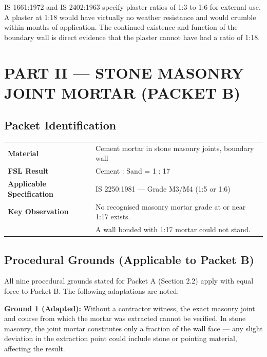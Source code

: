 \documentclass[12pt, a4paper]{article}
\begin{document}
IS 1661:1972 and IS 2402:1963 specify plaster ratios of 1:3 to 1:6 for external use. A plaster at 1:18 would have virtually no weather resistance and would crumble within months of application. The continued existence and function of the boundary wall is direct evidence that the plaster cannot have had a ratio of 1:18.

\section{PART II --- STONE MASONRY JOINT MORTAR (PACKET B)}

\subsection{Packet Identification}

\begin{center}
\begin{tabular}{|l|l|}
  \hline
  \textbf{Material} & Cement mortar in stone masonry joints, boundary wall \\
  \textbf{FSL Result} & Cement : Sand = 1 : 17 \\
  \textbf{Applicable Specification} & IS 2250:1981 --- Grade M3/M4 (1:5 or 1:6) \\
  \textbf{Key Observation} & No recognised masonry mortar grade at or near 1:17 exists. \\
                           & A wall bonded with 1:17 mortar could not stand. \\
  \hline
\end{tabular}
\end{center}

\subsection{Procedural Grounds (Applicable to Packet B)}

All nine procedural grounds stated for Packet A (Section 2.2) apply with equal force to Packet B. The following adaptations are noted:

\textbf{Ground 1 (Adapted):} Without a contractor witness, the exact masonry joint and course from which the mortar was extracted cannot be verified. In stone masonry, the joint mortar constitutes only a fraction of the wall face --- any slight deviation in the extraction point could include stone or pointing material, affecting the result.
\end{document}
